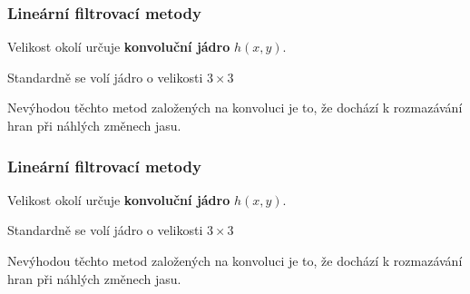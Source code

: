 \documentclass[FM]{tulpresentation}
\begin{document}
	\begin{frame}
		\frametitle{Lineární filtrovací metody}
		\begin{items}
			\item Velikost okolí určuje \textbf{konvoluční jádro} $h(x, y)$.
			\item Standardně se volí jádro o velikosti $3\times3$
			\item Nevýhodou těchto metod založených na 			konvoluci je to, že dochází k rozmazávání hran při náhlých změnech jasu.
		\end{items}
	\end{frame}
	
	\begin{frame}
		\frametitle{Lineární filtrovací metody}
		\begin{items}
			\item Velikost okolí určuje \textbf{konvoluční jádro} $h(x, y)$.
			\item Standardně se volí jádro o velikosti $3\times3$
			\item Nevýhodou těchto metod založených na 			konvoluci je to, že dochází k rozmazávání hran při náhlých změnech jasu.
		\end{items}
	\end{frame}
  \TULendframe
\end{document}
